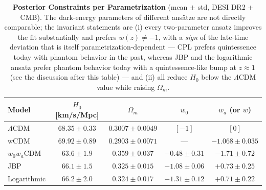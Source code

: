 \documentclass[aps,prd,preprint,superscriptaddress,nofootinbib]{revtex4-2}
\begin{document}
\begin{table}[!htbp]
    \centering
    \caption{\textbf{Posterior Constraints per Parametrization} (mean $\pm$ std, DESI DR2 + CMB). The dark-energy parameters of different ans\"atze are not directly comparable; the invariant statements are (i) every two-parameter ansatz improves the fit substantially and prefers $w(z) \neq -1$, with a \emph{sign} of the late-time deviation that is itself parametrization-dependent --- CPL prefers quintessence today with phantom behavior in the past, whereas JBP and the logarithmic ansatz prefer phantom behavior today with a quintessence-like bump at $z \approx 1$ (see the discussion after this table) --- and (ii) all reduce $H_0$ below the $\Lambda$CDM value while raising $\Omega_m$.}
    \label{m:tab:robustness}
    \begin{tabular}{lcccc}
        \toprule
        Model & $H_0$ [km/s/Mpc] & $\Omega_m$ & $w_0$ & $w_a$ (or $w$) \\
        \midrule
        $\Lambda$CDM & $68.35 \pm 0.33$ & $0.3007 \pm 0.0049$ & $[-1]$ & $[0]$ \\
        wCDM & $69.92 \pm 0.89$ & $0.2903 \pm 0.0071$ & --- & $-1.068 \pm 0.035$ \\
        $w_0 w_a$CDM & $63.6 \pm 1.9$ & $0.359 \pm 0.037$ & $-0.48 \pm 0.31$ & $-1.71 \pm 0.72$ \\
        JBP & $66.1 \pm 1.5$ & $0.325 \pm 0.015$ & $-1.08 \pm 0.06$ & $+0.73 \pm 0.25$ \\
        Logarithmic & $66.2 \pm 2.0$ & $0.324 \pm 0.017$ & $-1.31 \pm 0.12$ & $+0.71 \pm 0.22$ \\
        \bottomrule
    \end{tabular}
\end{table}
\end{document}
